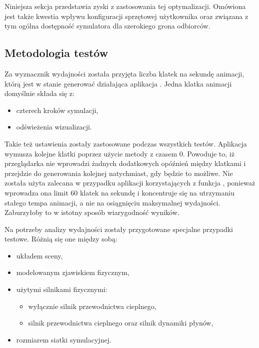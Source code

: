 Niniejsza sekcja przedstawia zyski z zastosowania tej optymalizacji. Omówiona
jest także kwestia wpływu konfiguracji sprzętowej użytkownika oraz związana z
tym ogólna dostępność symulatora dla szerokiego grona odbiorców.

\subsection{Metodologia testów}
\label{sec:metodologiaTestow}

Za wyznacznik wydajności została przyjęta liczba klatek na sekundę animacji,
którą jest w stanie generować działająca aplikacja \en. Jedna klatka animacji
domyślnie składa się z:

\begin{itemize}
\item czterech kroków symulacji, 
\item odświeżenia wizualizacji.
\end{itemize}

Takie też ustawienia zostały zastosowane podczas wszystkich testów.  Aplikacja
wymusza kolejne klatki poprzez użycie metody  z czasem 0.
Powoduje to, iż przeglądarka nie wprowadzi żadnych dodatkowych opóźnień między
klatkami i przejdzie do generowania kolejnej natychmiast, gdy będzie to
możliwe. Nie została użyta zalecana w przypadku aplikacji korzystających z
 funkcja , ponieważ wprowadza ona limit
60 klatek na sekundę i koncentruje się na utrzymaniu stałego tempa animacji, a
nie na osiągnięciu maksymalnej wydajności. Zaburzyłoby to w istotny sposób
wiarygodność wyników.

Na potrzeby analizy wydajności zostały przygotowane specjalne przypadki
testowe. Różnią się one między sobą:

\begin{itemize} 
\item układem sceny, 
\item modelowanym zjawiskiem fizycznym,
\item użytymi silnikami fizycznymi:
	\begin{itemize} 
	\item wyłącznie silnik przewodnictwa cieplnego,
	\item silnik przewodnictwa cieplnego oraz silnik dynamiki płynów,
	\end{itemize}
\item rozmiarem siatki symulacyjnej.
\end{itemize}

